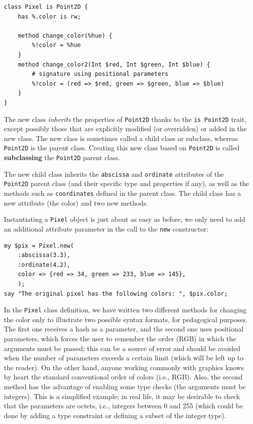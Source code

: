 \begin{verbatim}
class Pixel is Point2D {
    has %.color is rw;

    method change_color(%hue) {
        %!color = %hue
    }
    method change_color2(Int $red, Int $green, Int $blue) {
        # signature using positional parameters
        %!color = (red => $red, green => $green, blue => $blue)
    }
}
\end{verbatim}

The new class \emph{inherits} the properties of {\tt Point2D} 
thanks to the {\tt is Point2D} trait, except possibly those 
that are explicitly modified (or overridden) or added in 
the new class. The new class is sometimes called a 
child class or subclass, whereas {\tt Point2D} is the 
parent class. Creating this new class based on 
{\tt Point2D} is called {\bf subclassing} the {\tt Point2D} 
parent class. 

The new child class inherits the {\tt abscissa} and 
{\tt ordinate} attributes of the {\tt Point2D} parent 
class (and their specific type and properties if any), 
as well as the methods such as {\tt coordinates} defined 
in the parent class. The child class  has a new 
attribute (the color) and two new methods.

Instantiating a {\tt Pixel} object is just about as easy as 
before, we only need to add an additional attribute parameter 
in the call to the {\tt new} constructor:

\begin{verbatim}
my $pix = Pixel.new(
    :abscissa(3.3),
    :ordinate(4.2),
    color => {red => 34, green => 233, blue => 145}, 
    );
say "The original pixel has the following colors: ", $pix.color;
\end{verbatim}

In the {\tt Pixel} class definition, we have written 
two different methods for changing the color 
only to illustrate two possible syntax formats, for pedagogical 
purposes. The first one receives a hash as a parameter, and 
the second one uses positional parameters, which forces 
the user to remember the order (RGB) in which the arguments must 
be passed; this can be a source of error and should be avoided 
when the number of parameters exceeds a certain limit 
(which will be left up to the reader). On the other 
hand, anyone working commonly with graphics knows by heart the 
standard conventional order of colors (i.e., RGB). Also, 
the second method has the 
advantage of enabling some type checks (the arguments must 
be integers). This is a simplified example; in real life, it 
may be desirable to check that the parameters are octets, i.e., 
integers between 0 and 255 (which could be done by adding a 
type constraint or defining a subset of the integer type).

